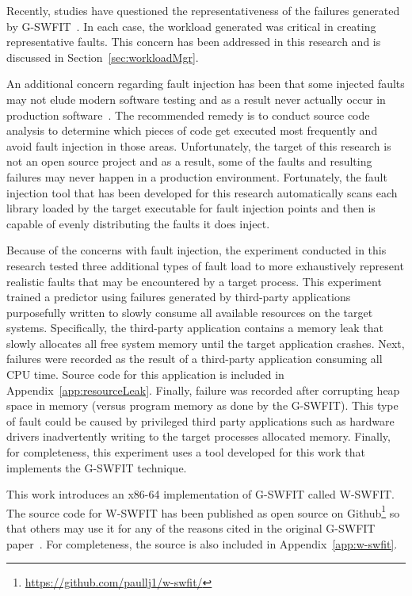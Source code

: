 Recently, studies have questioned the representativeness of the failures
generated by \ac{G-SWFIT}~\cite{cotroneo2012,kikuchi2014}.  In each case, the
workload generated was critical in creating representative faults.  This
concern has been addressed in this research and is discussed in
Section~\ref{sec:workloadMgr}.

An additional concern regarding fault injection has been that some injected
faults may not elude modern software testing and as a result never actually
occur in production software~\cite{natella2010}.  The recommended remedy is to
conduct source code analysis to determine which pieces of code get executed
most frequently and avoid fault injection in those areas.  Unfortunately, the
target of this research is not an open source project and as a result, some of
the faults and resulting failures may never happen in a production environment.
Fortunately, the fault injection tool that has been developed for this research
automatically scans each library loaded by the target executable for fault
injection points and then is capable of evenly distributing the faults it does
inject.

Because of the concerns with fault injection, the experiment conducted in this
research tested three additional types of fault load to more exhaustively
represent realistic faults that may be encountered by a target process.  This
experiment trained a predictor using failures generated by third-party
applications purposefully written to slowly consume all available resources on
the target systems.  Specifically, the third-party application contains a
memory leak that slowly allocates all free system memory until the target
application crashes.  Next, failures were recorded as the result of a
third-party application consuming all \ac{CPU} time.  Source code for this
application is included in Appendix~\ref{app:resourceLeak}.  Finally, failure
was recorded after corrupting heap space in memory (versus program memory as
done by the \ac{G-SWFIT}).  This type of fault could be caused by privileged
third party applications such as hardware drivers inadvertently writing to the
target processes allocated memory.  Finally, for completeness, this experiment
uses a tool developed for this work that implements the \ac{G-SWFIT} technique.

This work introduces an x86-64 implementation of \ac{G-SWFIT} called
\ac{W-SWFIT}.  The source code for \ac{W-SWFIT} has been published as open
source on Github\footnote{\url{https://github.com/paullj1/w-swfit/}} so that
others may use it for any of the reasons cited in the original \ac{G-SWFIT}
paper~\cite{gswfit}.  For completeness, the source is also included in
Appendix~\ref{app:w-swfit}.  

